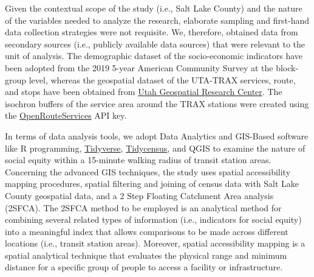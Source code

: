 \documentclass[numbered]{trbunofficial}
\begin{document}
Given the contextual scope of the study (i.e., Salt Lake County) and the nature of the variables needed to analyze the research, elaborate sampling and first-hand data collection strategies were not requisite. We, therefore, obtained data from secondary sources (i.e., publicly available data sources) that were relevant to the unit of analysis. The demographic dataset of the socio-economic indicators have been adopted from the 2019 5-year American Community Survey at the block-group level, whereas the geospatial dataset of the UTA-TRAX services, route, and stops have been obtained from \href{https://gis.utah.gov/data/transportation/transit/#UTALightRailStations}{Utah Geospatial Research Center}. The isochron buffers of the service area around the TRAX stations were created using the \href{https://github.com/GIScience/openrouteservice-r}{OpenRouteServices} API key.

In terms of data analysis tools, we adopt Data Analytics and GIS-Based software like R programming, \href{https://github.com/tidyverse}{Tidyverse}, \href{https://github.com/walkerke/tidycensus}{Tidycensus}, and QGIS to examine the nature of social equity within a 15-minute walking radius of transit station areas. Concerning the advanced GIS techniques, the study uses spatial accessibility mapping procedures, spatial filtering and joining of census data with Salt Lake County geospatial data, and a 2 Step Floating Catchment Area analysis (2SFCA). The 2SFCA method to be employed is an analytical method for combining several related types of information (i.e., indicators for social equity) into a meaningful index that allows comparisons to be made across different locations (i.e., transit station areas). Moreover, spatial accessibility mapping is a spatial analytical technique that evaluates the physical range and minimum distance for a specific group of people to access a facility or infrastructure.
\end{document}
